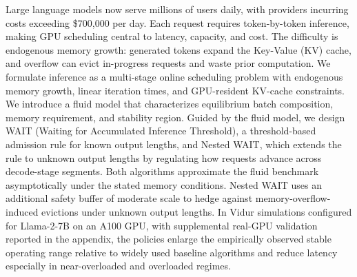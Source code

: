 Large language models now serve millions of users daily, with providers incurring costs exceeding \$700{,}000 per day. Each request requires token-by-token inference, making GPU scheduling central to latency, capacity, and cost. The difficulty is endogenous memory growth: generated tokens expand the Key-Value (KV) cache, and overflow can evict in-progress requests and waste prior computation. We formulate inference as a multi-stage online scheduling problem with endogenous memory growth, linear iteration times, and GPU-resident KV-cache constraints. We introduce a fluid model that characterizes equilibrium batch composition, memory requirement, and stability region. Guided by the fluid model, we design WAIT (Waiting for Accumulated Inference Threshold), a threshold-based admission rule for known output lengths, and Nested WAIT, which extends the rule to unknown output lengths by regulating how requests advance across decode-stage segments. Both algorithms approximate the fluid benchmark asymptotically under the stated memory conditions. Nested WAIT uses an additional safety buffer of moderate scale to hedge against memory-overflow-induced evictions under unknown output lengths. In Vidur simulations configured for Llama-2-7B on an A100 GPU, with supplemental real-GPU validation reported in the appendix, the policies enlarge the empirically observed stable operating range relative to widely used baseline algorithms and reduce latency especially in near-overloaded and overloaded regimes.
